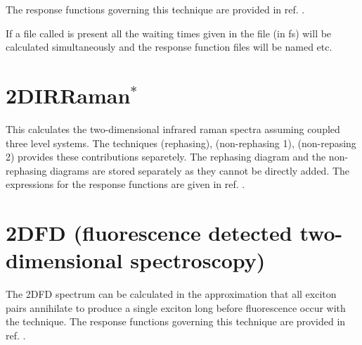 The response functions governing this technique are provided in ref. \cite{Zhong.2024.J.Chem.TheoryComput..20.6111}.

If a file called  is present all the waiting times given in the file (in fs) will be calculated simultaneously and the response function files will be named  etc.

\section{2DIRRaman$^{*}$}
This calculates the two-dimensional infrared raman spectra assuming coupled three level systems.
The techniques  (rephasing),  (non-rephasing 1),  (non-repasing 2) provides these contributions separetely.
The rephasing diagram and the non-rephasing diagrams are stored separately as they cannot be directly added.
The expressions for the response functions are given in ref. \cite{vanHengel.2023.J.Chem.Phys..158.064106}.

\section{2DFD (fluorescence detected two-dimensional spectroscopy)}
 The 2DFD spectrum can be calculated in the approximation that all exciton pairs annihilate to produce a single exciton long before fluorescence occur with the  technique.
 The response functions governing this technique are provided in ref. \cite{Kunsel_2018}.
